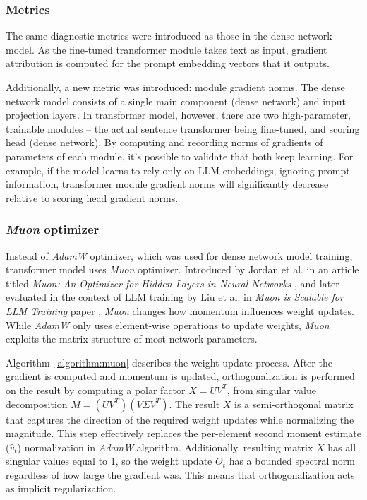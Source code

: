 \documentclass[a4paper,11pt,twoside]{report}
\theoremstyle{definition}
\begin{document}
\subsubsection{Metrics}
\label{section:transformer-model-metrics}

The same diagnostic metrics were introduced as those in the dense network model. As the fine-tuned transformer module takes text as input, gradient attribution is computed for the prompt embedding vectors that it outputs.

Additionally, a new metric was introduced: module gradient norms. The dense network model consists of a single main component (dense network) and input projection layers. In transformer model, however, there are two high-parameter, trainable modules -- the actual sentence transformer being fine-tuned, and scoring head (dense network). By computing and recording norms of gradients of parameters of each module, it's possible to validate that both keep learning. For example, if the model learns to rely only on LLM embeddings, ignoring prompt information, transformer module gradient norms will significantly decrease relative to scoring head gradient norms.

\subsubsection{\textit{Muon} optimizer}
\label{section:muon}

Instead of \textit{AdamW} optimizer, which was used for dense network model training, transformer model uses \textit{Muon} optimizer. Introduced by Jordan et al. in an article titled \textit{Muon: An Optimizer for Hidden Layers in Neural Networks} \cite{jordan2024muon}, and later evaluated in the context of LLM training by Liu et al. in \textit{Muon is Scalable for LLM Training} paper \cite{liu2025muonscalable}, \textit{Muon} changes how momentum influences weight updates. While \textit{AdamW} only uses element-wise operations to update weights, \textit{Muon} exploits the matrix structure of most network parameters.  

Algorithm~\ref{algorithm:muon} describes the weight update process. After the gradient is computed and momentum is updated, orthogonalization is performed on the result by computing a polar factor $X = U V^T$, from singular value decomposition $M = (U V^T)(V \Sigma V^T)$. The result $X$ is a semi-orthogonal matrix that captures the direction of the required weight updates while normalizing the magnitude. This step effectively replaces the per-element second moment estimate ($\hat{v}_t$) normalization in \textit{AdamW} algorithm. Additionally, resulting matrix $X$ has all singular values equal to 1, so the weight update $O_t$ has a bounded spectral norm regardless of how large the gradient was. This means that orthogonalization acts as implicit regularization.
\end{document}
